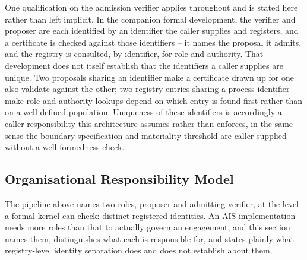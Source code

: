 \documentclass[11pt,a4paper]{article}
\theoremstyle{definition}
\theoremstyle{remark}
\begin{document}
One qualification on the admission verifier applies throughout and is stated here rather than left implicit. In the companion formal development, the verifier and proposer are each identified by an identifier the caller supplies and registers, and a certificate is checked against those identifiers -- it names the proposal it admits, and the registry is consulted, by identifier, for role and authority. That development does not itself establish that the identifiers a caller supplies are unique. Two proposals sharing an identifier make a certificate drawn up for one also validate against the other; two registry entries sharing a process identifier make role and authority lookups depend on which entry is found first rather than on a well-defined population. Uniqueness of these identifiers is accordingly a caller responsibility this architecture assumes rather than enforces, in the same sense the boundary specification and materiality threshold are caller-supplied without a well-formedness check.

\subsection{Organisational Responsibility Model}
\label{sec:roles}

The pipeline above names two roles, proposer and admitting verifier, at the level a formal kernel can check: distinct registered identities. An AIS implementation needs more roles than that to actually govern an engagement, and this section names them, distinguishes what each is responsible for, and states plainly what registry-level identity separation does and does not establish about them.
\end{document}
